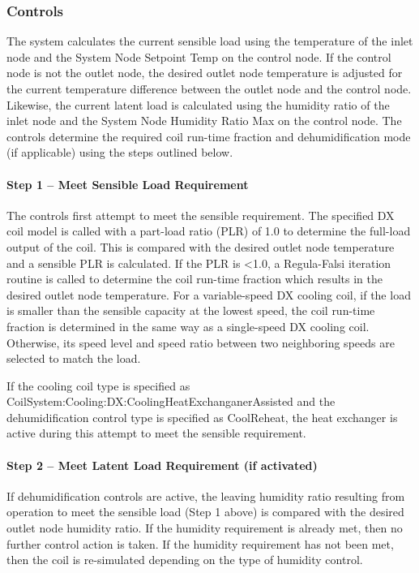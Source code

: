 \subsubsection{Controls}\label{controls-1}

The system calculates the current sensible load using the temperature of the inlet node and the System Node Setpoint Temp on the control node. If the control node is not the outlet node, the desired outlet node temperature is adjusted for the current temperature difference between the outlet node and the control node. Likewise, the current latent load is calculated using the humidity ratio of the inlet node and the System Node Humidity Ratio Max on the control node. The controls determine the required coil run-time fraction and dehumidification mode (if applicable) using the steps outlined below.

\paragraph{Step 1 -- Meet Sensible Load Requirement}\label{step-1-meet-sensible-load-requirement-1}

The controls first attempt to meet the sensible requirement. The specified DX coil model is called with a part-load ratio (PLR) of 1.0 to determine the full-load output of the coil. This is compared with the desired outlet node temperature and a sensible PLR is calculated. If the PLR is \textless{}1.0, a Regula-Falsi iteration routine is called to determine the coil run-time fraction which results in the desired outlet node temperature. For a variable-speed DX cooling coil, if the load is smaller than the sensible capacity at the lowest speed, the coil run-time fraction is determined in the same way as a single-speed DX cooling coil. Otherwise, its speed level and speed ratio between two neighboring speeds are selected to match the load.

If the cooling coil type is specified as CoilSystem:Cooling:DX:CoolingHeatExchanganerAssisted and the dehumidification control type is specified as CoolReheat, the heat exchanger is active during this attempt to meet the sensible requirement.

\paragraph{Step 2 -- Meet Latent Load Requirement (if activated)}\label{step-2-meet-latent-load-requirement-if-activated-1}

If dehumidification controls are active, the leaving humidity ratio resulting from operation to meet the sensible load (Step 1 above) is compared with the desired outlet node humidity ratio. If the humidity requirement is already met, then no further control action is taken. If the humidity requirement has not been met, then the coil is re-simulated depending on the type of humidity control.

